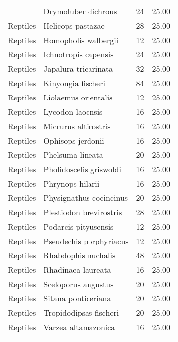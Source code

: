 \begin{longtable}{llcc}
{  Reptiles & Drymoluber dichrous &  24 & 25.00 \\ 
  Reptiles & Helicops pastazae &  28 & 25.00 \\ 
  Reptiles & Homopholis walbergii &  12 & 25.00 \\ 
  Reptiles & Ichnotropis capensis &  24 & 25.00 \\ 
  Reptiles & Japalura tricarinata &  32 & 25.00 \\ 
  Reptiles & Kinyongia fischeri &  84 & 25.00 \\ 
  Reptiles & Liolaemus orientalis &  12 & 25.00 \\ 
  Reptiles & Lycodon laoensis &  16 & 25.00 \\ 
  Reptiles & Micrurus altirostris &  16 & 25.00 \\ 
  Reptiles & Ophisops jerdonii &  16 & 25.00 \\ 
  Reptiles & Phelsuma lineata &  20 & 25.00 \\ 
  Reptiles & Pholidoscelis griswoldi &  16 & 25.00 \\ 
  Reptiles & Phrynops hilarii &  16 & 25.00 \\ 
  Reptiles & Physignathus cocincinus &  20 & 25.00 \\ 
  Reptiles & Plestiodon brevirostris &  28 & 25.00 \\ 
  Reptiles & Podarcis pityusensis &  12 & 25.00 \\ 
  Reptiles & Pseudechis porphyriacus &  12 & 25.00 \\ 
  Reptiles & Rhabdophis nuchalis &  48 & 25.00 \\ 
  Reptiles & Rhadinaea laureata &  16 & 25.00 \\ 
  Reptiles & Sceloporus angustus &  20 & 25.00 \\ 
  Reptiles & Sitana ponticeriana &  20 & 25.00 \\ 
  Reptiles & Tropidodipsas fischeri &  20 & 25.00 \\ 
  Reptiles & Varzea altamazonica &  16 & 25.00 \\ 
   \hline
\hline
\label{table-best}
\end{longtable}
